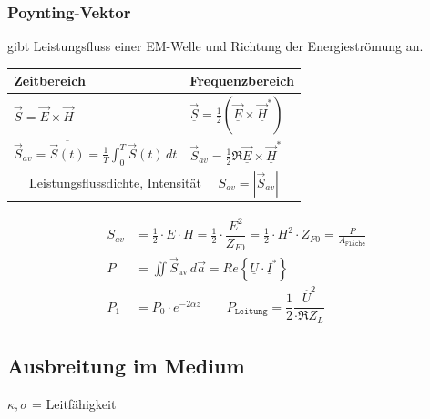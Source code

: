 \subsubsection{Poynting-Vektor}
gibt Leistungsfluss einer EM-Welle und Richtung der Energieströmung an.\\
\begin{tabular}{|l|l|}
	\hline
	Zeitbereich & Frequenzbereich\\
	\hline
	$\vec{S} = \vec{E} \times \vec{H}$ & $\vec{\underline{S}} = \frac{1}{2} (\underline{\vec{E}} \times \underline{\vec{H}}^*)$ \\
	$\vec{S}_{av} = \overline{\vec{S}(t)} = \frac{1}{T} \int_{0}^{T} \vec{S}(t) \,dt $ & $\vec{S}_{av} = \frac{1}{2} \Re{\underline{\vec{E}} \times \underline{\vec{H}}^*}$\\
	\hline
	\multicolumn{2}{|c|}{Leistungsflussdichte, Intensität $\quad S_{av} = |\vec{S}_{av}|$}\\
	\hline
\end{tabular}
\begin{align*}
	S_{av}              & =  \frac{1}{2} \cdot E \cdot H 
	=  \frac{1}{2} \cdot \dfrac{E^2}{Z_{F0}}            
	=  \frac{1}{2} \cdot H^2 \cdot Z_{F0} 
	=  \frac{P}{A_\texttt{Fläche}}\\
	P &= \iint\vec{S}_{\text{av}}\, d\vec{a}                
	= Re\left\{\underline{U}\cdot\underline{I}^*\right\}\\
	P_1 & = P_0 \cdot e^{-2\alpha z} \qquad P_{\texttt{Leitung}} = \dfrac{1}{2} \dfrac{\hat{U}^2}{\cdot \Re{Z_L}}
\end{align*}
\newcolumn
\subsection{Ausbreitung im Medium}
$ \kappa, \sigma $ = Leitfähigkeit
